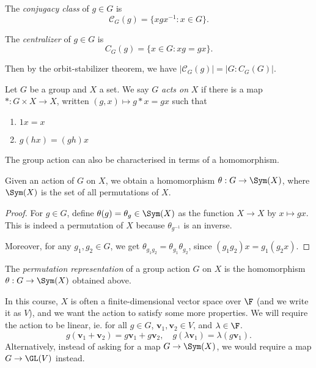 \documentclass[a4paper]{article}
\begin{document}
\begin{defi}
  The \emph{conjugacy class} of $g \in G$ is
  \[
    \mathcal{C}_G(g)=\{xgx^{-1}: x \in G\}.
  \]
\end{defi}

\begin{defi}[Centralizer]
  The \emph{centralizer} of $g \in G$ is
  \[
    C_G(g) = \{x \in G: xg = gx\}.
  \]
\end{defi}
Then by the orbit-stabilizer theorem, we have $|\mathcal{C}_G(g)| = |G: C_G(G)|$.

\begin{defi}
  Let $G$ be a group and $X$ a set. We say $G$ \emph{acts on} $X$ if there is a map $*: G \times X \to X$, written $(g, x) \mapsto g * x = gx$ such that
  \begin{enumerate}
    \item $1x = x$
    \item $g(hx) = (gh)x$
  \end{enumerate}
\end{defi}

The group action can also be characterised in terms of a homomorphism.
\begin{lemma}
  Given an action of $G$ on $X$, we obtain a homomorphism $\theta: G \to \Sym(X)$, where $\Sym(X)$ is the set of all permutations of $X$.
\end{lemma}

\begin{proof}
  For $g \in G$, define $\theta(g) = \theta_g \in \Sym (X)$ as the function $X \to X$ by $x \mapsto gx$. This is indeed a permutation of $X$ because $\theta_{g^{-1}}$ is an inverse.

  Moreover, for any $g_1, g_2 \in G$, we get $\theta_{g_1g_2} = \theta_{g_1} \theta_{g_2}$, since $(g_1g_2) x = g_1(g_2x)$.
\end{proof}

\begin{defi}
  The \emph{permutation representation} of a group action $G$ on $X$ is the homomorphism $\theta: G \to \Sym (X)$ obtained above.
\end{defi}

In this course, $X$ is often a finite-dimensional vector space over $\F$ (and we write it as $V$), and we want the action to satisfy some more properties. We will require the action to be linear, ie. for all $g \in G$, $\mathbf{v}_1, \mathbf{v}_2 \in V$, and $\lambda \in \F$.
\[
  g(\mathbf{v}_1 + \mathbf{v}_2) = g \mathbf{v}_1 + g \mathbf{v}_2,\quad g(\lambda \mathbf{v}_1) = \lambda (g\mathbf{v}_1).
\]
Alternatively, instead of asking for a map $G \to \Sym(X)$, we would require a map $G \to \GL(V)$ instead.
\end{document}
